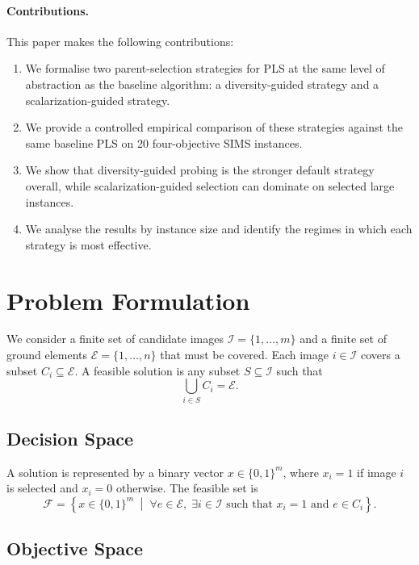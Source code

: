 \documentclass[11pt,a4paper]{article}
\newcommand{\calE}{\ensuremath{\mathcal{E}}}
\newcommand{\calF}{\ensuremath{\mathcal{F}}}
\newcommand{\calI}{\ensuremath{\mathcal{I}}}
\begin{document}
\paragraph{Contributions.}
This paper makes the following contributions:
\begin{enumerate}
  \item We formalise two parent-selection strategies for PLS at the same
    level of abstraction as the baseline algorithm: a diversity-guided
    strategy and a scalarization-guided strategy.
  \item We provide a controlled empirical comparison of these strategies
    against the same baseline PLS on 20 four-objective SIMS instances.
  \item We show that diversity-guided probing is the stronger default
    strategy overall, while scalarization-guided selection can dominate
    on selected large instances.
  \item We analyse the results by instance size and identify the regimes
    in which each strategy is most effective.
\end{enumerate}

\section{Problem Formulation}\label{sec:problem}

We consider a finite set of candidate images
\(\calI = \{1,\dots,m\}\) and a finite set of ground elements
\(\calE = \{1,\dots,n\}\) that must be covered.  Each image
\(i \in \calI\) covers a subset \(C_i \subseteq \calE\).  A feasible
solution is any subset \(S \subseteq \calI\) such that
\[
\bigcup_{i \in S} C_i = \calE.
\]

\subsection{Decision Space}

A solution is represented by a binary vector
\(x \in \{0,1\}^m\), where \(x_i = 1\) if image \(i\) is selected and
\(x_i = 0\) otherwise.  The feasible set is
\[
\calF = \left\{x \in \{0,1\}^m \;\middle|\; \forall e \in \calE,\;
\exists i \in \calI \text{ such that } x_i = 1 \text{ and } e \in C_i
\right\}.
\]

\subsection{Objective Space}
\end{document}
